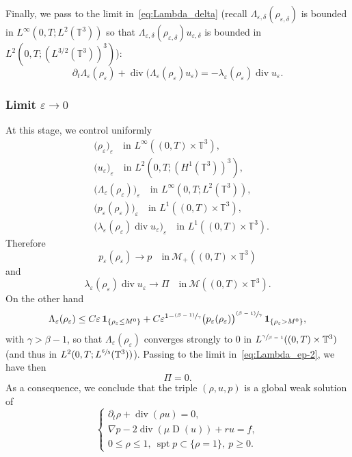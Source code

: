 \documentclass[JEP,XML,SOM,Unicode,NoEqCountersInSection]{cedram}
\let\mathcal\mathscr
\newcommand{\<}{\bigl\langle}
\renewcommand{\>}{\bigr\rangle}
\newcommand{\psfrac}[2]{\sfrac{(#1)}{#2}}
\DeclareMathOperator{\spt}{spt}
\newcommand{\labeleq}[1]{}
\newenvironment{subnumcasess}{\begin{equation*}\begin{cases}}{\end{cases}\end{equation*}}
\theoremstyle{definition}
\theoremstyle{remark}
\newcommand{\TT}{\mathbb{T}^3}
\DeclareMathOperator{\Div}{div}
\DeclareMathOperator{\D}{D}
\let\ep\varepsilon
\begin{document}
Finally, we pass to the limit in~\eqref{eq:Lambda_delta} (recall $\Lambda_{\ep,\delta}(\rho_{\ep,\delta})$ is bounded in $L^\infty(0,T;L^2(\TT))$ so that $\Lambda_{\ep,\delta}(\rho_{\ep,\delta}) u_{\ep,\delta}$ is bounded in $L^2(0,T;(L^{3/2}(\TT))^3)$):
\begin{equation}\label{eq:Lambda_ep-2}
\partial_t \Lambda_\ep(\rho_\ep) + \Div\big(\Lambda_\ep(\rho_\ep) u_\ep \big) = -\lambda_\ep(\rho_\ep)\Div u_\ep.
\end{equation}

\subsubsection{Limit $\ep \rightarrow 0$}
At this stage, we control uniformly
\begin{align*}
&\big(\rho_\ep \big)_\ep \quad \text{in } L^\infty((0,T)\times \TT), \\
&\big(u_\ep \big)_\ep \quad \text{in } L^2(0,T;(H^1(\TT))^3), \\
&\big(\Lambda_\ep(\rho_\ep)\big)_\ep \quad \text{in } L^\infty(0,T; L^2(\TT)),\\
&\big(p_\ep(\rho_\ep)\big)_\ep \quad \text{in } L^1((0,T)\times \TT),\\
&\big(\lambda_\ep(\rho_\ep) \Div u_\ep\big)_\ep \quad \text{in } L^1((0,T)\times \TT).
\end{align*}
Therefore
\begin{equation*}
p_\ep(\rho_\ep) \to p \quad \text{in}~\mathcal{M}_+((0,T)\times \TT)
\end{equation*}
and
\begin{equation*}
\lambda_\ep(\rho_\ep) \Div u_\ep\to \Pi \quad \text{in}~\mathcal{M}((0,T)\times \TT).
\end{equation*}
On the other hand
\begin{equation*}
\Lambda_\ep(\rho_\ep) \leq C \ep \,\mathbf{1}_{\{\rho_\ep \leq M^0\}}
+ C \ep^{1- \psfrac{\beta-1}{\gamma}} \big(p_\ep(\rho_\ep) \big)^{\psfrac{\beta-1}{\gamma}} \,\mathbf{1}_{\{\rho_\ep > M^0\}},
\end{equation*}
with $\gamma > \beta-1$, so that $\Lambda_\ep(\rho_\ep)$ converges strongly to $0$ in $L^{\sfrac{\gamma}{\beta-1}}((0,T)\times \TT)$ (and thus in $L^2(0,T;L^{\sfrac{6}{5}}(\TT))$).
Passing to the limit in~\eqref{eq:Lambda_ep-2}, we have then
\[
\Pi = 0.
\]
As a consequence, we conclude that the triple $(\rho, u, p)$ is a global weak solution of
\begin{subnumcasess}{\labeleq{xxx3}}
\partial_t \rho + \Div (\rho u) = 0, \\
\nabla p - 2 \Div(\mu \D(u)) + ru = f, \\
0 \leq \rho \leq 1, ~\spt p \subset \{\rho = 1\},~ p \geq 0.
\end{subnumcasess}%
\end{document}
